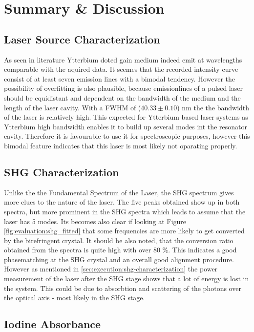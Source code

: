 \section{Summary \& Discussion}
\label{sec:discussion}
\subsection{Laser Source Characterization}
As seen in literature \cite{Koerner:12} Ytterbium doted gain medium indeed emit at wavelengths  comparable with the aquired data.
It seemes that the recorded intensity curve consist of at least seven emission lines with a bimodal tendency.
However the possibility of overfitting is also plausible, because emissionlines of a pulsed laser should be equidistant and dependent on the bandwidth of the medium and the length of the laser cavity.
With a FWHM of ($40.33 \pm 0.10$) nm the the bandwidth of the laser is relatively high.
This expected for Ytterbium based laser systems as Ytterbium high bandwidth enables it to build up several modes int the resonator cavity.
Therefore it is favourable to use it for spectroscopic purposes, however this bimodal feature indicates that this laser is most likely not oparating properly.

\subsection{SHG Characterization}
Unlike the the Fundamental Spectrum of the Laser, the SHG spectrum gives more clues to the nature of the laser.
The five peaks obtained show up in both spectra, but more prominent in the SHG spectra which leads to assume that the laser has 5 modes.
Its becomes also clear if looking at Figure \ref{fig:evaluation:shg_fitted} that some frequencies are more likely to get converted by the birefringent crystal.
It should be also noted, that the conversion ratio obtained from the spectra is quite high with over 80 \%.
This indicates a good phasematching at the SHG crystal and an overall good alignment procedure.
However as mentioned in \ref{sec:execution:shg-characterization} the power measurement of the laser after the SHG stage shows that a lot of energy is lost in the system.
This could be due to absorbtion and scattering of the photons over the optical axis - most likely in the SHG stage. 


\subsection{Iodine Absorbance}
\label{sec:discussion:iodine-absorbance}


